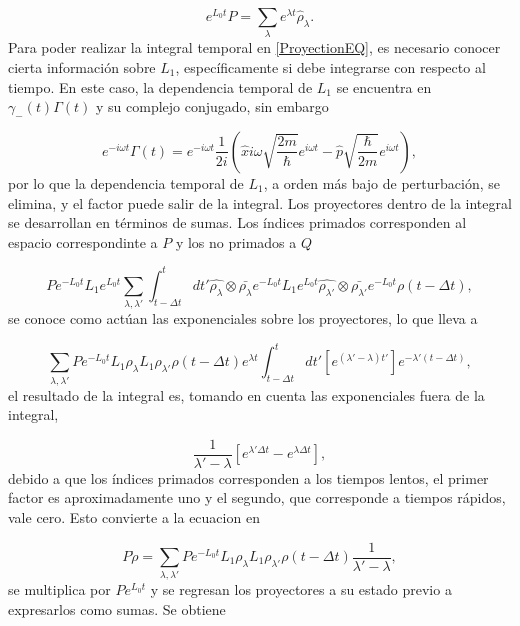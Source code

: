 \documentclass[a4paper,10pt]{report}
\begin{document}
\begin{equation}
e^{L_0 t} P = \sum_\lambda e^{\lambda t} \hat{\rho}_\lambda.
\end{equation} Para poder realizar la integral temporal en \eqref{ProyectionEQ}, es necesario conocer cierta información sobre $L_1$, específicamente si debe integrarse con respecto al tiempo. En este caso, la dependencia temporal de $L_1$ se encuentra en $\gamma_-(t)\Gamma(t)$ y su complejo conjugado, sin embargo

\begin{equation}
e^{-i\omega t}\Gamma(t) = e^{-i\omega t}\frac{1}{2i}(\hat{x}i\omega \sqrt{\frac{2m}{\hbar}}e^{i\omega t}-\hat{p}\sqrt{\frac{\hbar}{2m}}e^{i\omega t}), 
\end{equation}por lo que la dependencia temporal de $L_1$, a orden más bajo de perturbación, se elimina, y el factor puede salir de la integral. Los proyectores dentro de la integral se desarrollan en términos de sumas. Los índices primados corresponden al espacio correspondinte a $P$ y los no primados a $Q$

\begin{equation}
P e^{-L_0 t}L_1e^{L_0 t}\sum_{\lambda ,\lambda'}\int_{t-\Delta t}^{t}dt'\hat{\rho_\lambda}\otimes\bar{\rho_\lambda}e^{-L_0 t}L_1e^{L_0 t}\hat{\rho_{\lambda'}}\otimes\bar{\rho_{\lambda'}}e^{-L_0 t}\rho(t-\Delta t),
\end{equation} se conoce como actúan las exponenciales sobre los proyectores, lo que lleva a

\begin{equation}
\sum_{\lambda ,\lambda'} P e^{-L_0 t} L_1 \rho_{\lambda} L_1 \rho_{\lambda'} \rho(t-\Delta t) e^{\lambda t} \int_{t-\Delta t}^{t} dt'[ e^{(\lambda'-\lambda)t'}] e^{-\lambda'(t-\Delta t)},
\end{equation} el resultado de la integral es, tomando en cuenta las exponenciales fuera de la integral,

\begin{equation}
\frac{1}{\lambda' - \lambda} [e^{\lambda' \Delta t}-e^{\lambda \Delta t}],
\end{equation} debido a que los índices primados corresponden a los tiempos lentos, el primer factor es aproximadamente uno y el segundo, que corresponde a tiempos rápidos, vale cero. Esto convierte a la ecuacion en

\begin{equation}
P\dot{\rho}=\sum_{\lambda ,\lambda'} P e^{-L_0 t} L_1 \rho_{\lambda} L_1 \rho_{\lambda'} \rho(t-\Delta t)\frac{1}{\lambda' - \lambda} ,
\end{equation} se multiplica por $Pe^{L_0 t}$ y se regresan los proyectores a su estado previo a expresarlos como sumas. Se obtiene
\end{document}
